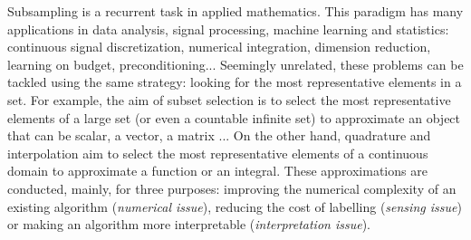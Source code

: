 \documentclass[twoside,11pt]{book}
\numberwithin{theorem}{chapter}
\numberwithin{definition}{chapter}
\numberwithin{proposition}{chapter}
\numberwithin{corollary}{chapter}
\numberwithin{example}{chapter}
\numberwithin{lemma}{chapter}
\numberwithin{assumption}{chapter}
\numberwithin{equation}{chapter}
\numberwithin{figure}{chapter}
\begin{document}




Subsampling is a recurrent task in applied mathematics. This paradigm has many applications in data analysis, signal processing, machine learning and statistics: continuous signal discretization, numerical integration, dimension reduction, learning on budget, preconditioning... Seemingly unrelated, these problems can be tackled using the same strategy: looking for the most representative elements in a set. For example,
the aim of subset selection is to select the most representative elements of a large set (or even a countable infinite set) to approximate an object that can be scalar, a vector, a matrix ... On the other hand, quadrature and interpolation aim to select the most representative elements of a continuous domain to approximate a function or an integral.
These approximations are conducted, mainly, for three purposes: improving the numerical complexity of an existing algorithm (\emph{numerical issue}), reducing the cost of labelling (\emph{sensing issue}) or making an algorithm more interpretable (\emph{interpretation issue}).
\end{document}
